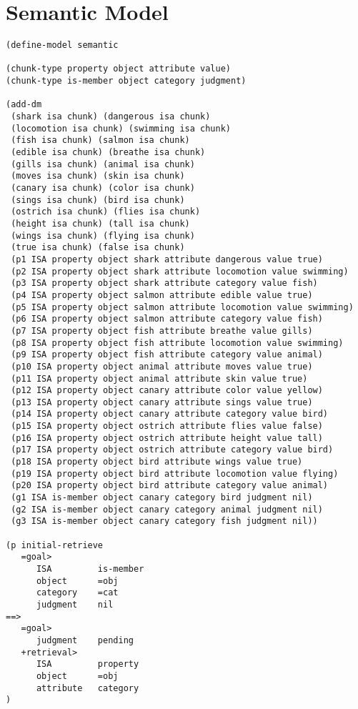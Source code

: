 \section{Semantic Model}
\label{app:ex:semantic_model}

\begin{lstlisting}[caption={ACT-R production rules for the semantic model}]
(define-model semantic

(chunk-type property object attribute value)
(chunk-type is-member object category judgment)

(add-dm
 (shark isa chunk) (dangerous isa chunk)
 (locomotion isa chunk) (swimming isa chunk) 
 (fish isa chunk) (salmon isa chunk)
 (edible isa chunk) (breathe isa chunk)
 (gills isa chunk) (animal isa chunk)
 (moves isa chunk) (skin isa chunk)
 (canary isa chunk) (color isa chunk)
 (sings isa chunk) (bird isa chunk) 
 (ostrich isa chunk) (flies isa chunk) 
 (height isa chunk) (tall isa chunk)
 (wings isa chunk) (flying isa chunk) 
 (true isa chunk) (false isa chunk) 
 (p1 ISA property object shark attribute dangerous value true)
 (p2 ISA property object shark attribute locomotion value swimming)
 (p3 ISA property object shark attribute category value fish)
 (p4 ISA property object salmon attribute edible value true)
 (p5 ISA property object salmon attribute locomotion value swimming)
 (p6 ISA property object salmon attribute category value fish)
 (p7 ISA property object fish attribute breathe value gills)
 (p8 ISA property object fish attribute locomotion value swimming)
 (p9 ISA property object fish attribute category value animal)
 (p10 ISA property object animal attribute moves value true)
 (p11 ISA property object animal attribute skin value true)
 (p12 ISA property object canary attribute color value yellow)
 (p13 ISA property object canary attribute sings value true)
 (p14 ISA property object canary attribute category value bird)
 (p15 ISA property object ostrich attribute flies value false)
 (p16 ISA property object ostrich attribute height value tall)
 (p17 ISA property object ostrich attribute category value bird)
 (p18 ISA property object bird attribute wings value true)
 (p19 ISA property object bird attribute locomotion value flying)
 (p20 ISA property object bird attribute category value animal)
 (g1 ISA is-member object canary category bird judgment nil)
 (g2 ISA is-member object canary category animal judgment nil)
 (g3 ISA is-member object canary category fish judgment nil))

(p initial-retrieve
   =goal>
      ISA         is-member
      object      =obj
      category    =cat
      judgment    nil
==>
   =goal>
      judgment    pending
   +retrieval>  
      ISA         property
      object      =obj
      attribute   category
)



\end{lstlisting}
